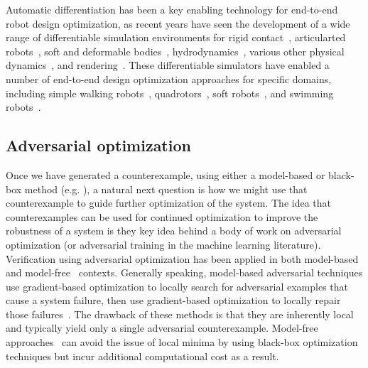 Automatic differentiation has been a key enabling technology for end-to-end robot design optimization, as recent years have seen the development of a wide range of differentiable simulation environments for rigid contact~\cite{heiden2021neuralsim,belubute_peres_lcp_physics,qiaoDifferentiableSimulationSoft2021,howelllecleach2022}, articularted robots~\cite{qiaoEfficientDifferentiableSimulation2021}, soft and deformable bodies~\cite{huChainQueenRealTimeDifferentiable2019,chenDaxBenchBenchmarkingDeformable2023,qiaoDifferentiableSimulationSoft2021}, hydrodynamics~\cite{ma2021diffaqua,leeAquariumFullyDifferentiable2023}, various other physical dynamics~\cite{huDiffTaichiDifferentiableProgramming2019, kidgerNeuralDifferentialEquations2022, murthyGradSimDifferentiableSimulation2021}, and rendering~\cite{zhaoPhysicsbasedDifferentiableRendering2020,Jakob2020DrJit,lelidecDifferentiableRenderingPerturbed2021}.
%
These differentiable simulators have enabled a number of end-to-end design optimization approaches for specific domains, including simple walking robots~\cite{Schulz_robogami}, quadrotors~\cite{du2016computational}, soft robots~\cite{soft_robot_optimization_review,matthewsEfficientAutomaticDesign2023}, and swimming robots~\cite{du2021underwater,ma2021diffaqua}.

\subsection{Adversarial optimization}

Once we have generated a counterexample, using either a model-based or black-box method (e.g. \cite{xuSafeBenchBenchmarkingPlatform2022,riedmaierSurveyScenarioBasedSafety2020,okellyScalableEndtoEndAutonomous2018,corsoAdaptiveStressTesting2019,wangAdvSimGeneratingSafetyCritical2021,sunCornerCaseGeneration2021,zhongGuidedConditionalDiffusion2022,corsoInterpretableSafetyValidation2020a,zhangAdversarialRobustnessTrajectory2022,hanselmannKINGGeneratingSafetyCritical2022a}), a natural next question is how we might use that counterexample to guide further optimization of the system. The idea that counterexamples can be used for continued optimization to improve the robustness of a system is they key idea behind a body of work on adversarial optimization (or adversarial training in the machine learning literature). Verification using adversarial optimization has been applied in both model-based~\cite{dontiAdversariallyRobustLearning2021} and model-free~\cite{corsoSurveyAlgorithmsBlackBox2021} contexts. Generally speaking, model-based adversarial techniques use gradient-based optimization to locally search for adversarial examples that cause a system failure, then use gradient-based optimization to locally repair those failures~\cite{dontiAdversariallyRobustLearning2021}. The drawback of these methods is that they are inherently local and typically yield only a single adversarial counterexample. Model-free approaches~\cite{corsoSurveyAlgorithmsBlackBox2021} can avoid the issue of local minima by using black-box optimization techniques but incur additional computational cost as a result.

